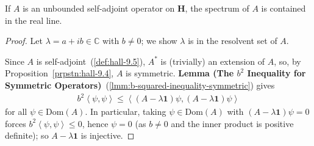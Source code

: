 \begin{theorem}
    \label{thrm:hall-9.17}
    \leanok
    If $A$ is an unbounded self-adjoint operator on $\mathbf{H}$, the spectrum of $A$ is contained in the real line.
\end{theorem}
\begin{proof}
    \leanok
Let $\lambda = a + ib \in \mathbb{C}$ with $b \ne 0$; we show $\lambda$ is in the resolvent set of $A$.

Since $A$ is self-adjoint~(\ref{def:hall-9.5}), $A^*$ is (trivially) an extension of $A$, so, by Proposition~\ref{prpstn:hall-9.4}, $A$ is symmetric. \textbf{Lemma (The $b^2$ Inequality for Symmetric Operators)}~(\ref{lmm:b-squared-inequality-symmetric}) gives
\begin{align}
    b^2 \left< \psi, \psi \right> \le \left< (A - \lambda \mathbf{1})\psi, (A - \lambda \mathbf{1})\psi \right> \tag{$\ast$}
\end{align}
for all $\psi \in \text{Dom}(A)$. In particular, taking $\psi \in \text{Dom}(A)$ with $(A - \lambda\mathbf{1})\psi = 0$ forces $b^2 \left< \psi, \psi \right> \le 0$, hence $\psi = 0$ (as $b \ne 0$ and the inner product is positive definite); so $A - \lambda \mathbf{1}$ is injective.


\end{proof}
